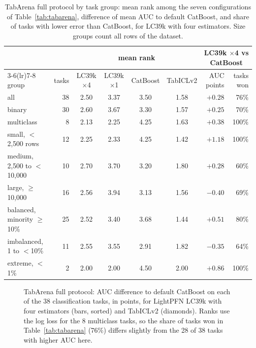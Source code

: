 \documentclass[11pt]{article}
\begin{document}
\begin{table}[t]
\centering
\footnotesize
\setlength{\tabcolsep}{4pt}
\begin{tabular}{lrccccrr}
\toprule
& & \multicolumn{4}{c}{mean rank} & \multicolumn{2}{c}{LC39k $\times$4 vs CatBoost} \\
\cmidrule(lr){3-6}\cmidrule(lr){7-8}
group & tasks & LC39k $\times$4 & LC39k $\times$1 & CatBoost & TabICLv2 & AUC points & tasks won \\
\midrule
all & 38 & 2.50 & 3.37 & 3.50 & 1.58 & $+0.28$ & 76\% \\
binary & 30 & 2.60 & 3.67 & 3.30 & 1.57 & $+0.25$ & 70\% \\
multiclass & 8 & 2.13 & 2.25 & 4.25 & 1.63 & $+0.38$ & 100\% \\
small, $<$2,500 rows & 12 & 2.25 & 2.33 & 4.25 & 1.42 & $+1.18$ & 100\% \\
medium, 2,500 to $<$10,000 & 10 & 2.70 & 3.70 & 3.20 & 1.80 & $+0.28$ & 60\% \\
large, $\ge$10,000 & 16 & 2.56 & 3.94 & 3.13 & 1.56 & $-0.40$ & 69\% \\
balanced, minority $\ge$10\% & 25 & 2.52 & 3.40 & 3.68 & 1.44 & $+0.51$ & 80\% \\
imbalanced, 1 to $<$10\% & 11 & 2.55 & 3.55 & 2.91 & 1.82 & $-0.35$ & 64\% \\
extreme, $<$1\% & 2 & 2.00 & 2.00 & 4.50 & 2.00 & $+0.86$ & 100\% \\
\bottomrule
\end{tabular}
\caption{TabArena full protocol by task group: mean rank among the seven configurations of Table~\ref{tab:tabarena},
difference of mean AUC to default CatBoost, and share of tasks with lower error than CatBoost, for LC39k with four
estimators. Size groups count all rows of the dataset.}
\label{tab:tabgroups}
\end{table}

\begin{figure}[tbp]
\centering

\caption{TabArena full protocol: AUC difference to default CatBoost on each of the 38 classification tasks, in
points, for LightPFN LC39k with four estimators (bars, sorted) and TabICLv2 (diamonds). Ranks use the log loss for
the 8 multiclass tasks, so the share of tasks won in Table~\ref{tab:tabarena} (76\%) differs slightly from the 28
of 38 tasks with higher AUC here.}
\label{fig:tabarena}
\end{figure}
\end{document}
